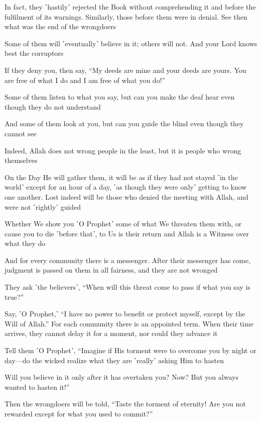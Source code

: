In fact, they ˹hastily˺ rejected the Book without comprehending it and before the fulfilment of its warnings. Similarly, those before them were in denial. See then what was the end of the wrongdoers

Some of them will ˹eventually˺ believe in it; others will not. And your Lord knows best the corruptors

If they deny you, then say, “My deeds are mine and your deeds are yours. You are free of what I do and I am free of what you do!”

Some of them listen to what you say, but can you make the deaf hear even though they do not understand

And some of them look at you, but can you guide the blind even though they cannot see

Indeed, Allah does not wrong people in the least, but it is people who wrong themselves

On the Day He will gather them, it will be as if they had not stayed ˹in the world˺ except for an hour of a day, ˹as though they were only˺ getting to know one another. Lost indeed will be those who denied the meeting with Allah, and were not ˹rightly˺ guided

Whether We show you ˹O Prophet˺ some of what We threaten them with, or cause you to die ˹before that˺, to Us is their return and Allah is a Witness over what they do

And for every community there is a messenger. After their messenger has come, judgment is passed on them in all fairness, and they are not wronged

They ask ˹the believers˺, “When will this threat come to pass if what you say is true?”

Say, ˹O Prophet,˺ “I have no power to benefit or protect myself, except by the Will of Allah.” For each community there is an appointed term. When their time arrives, they cannot delay it for a moment, nor could they advance it

Tell them ˹O Prophet˺, “Imagine if His torment were to overcome you by night or day—do the wicked realize what they are ˹really˺ asking Him to hasten

Will you believe in it only after it has overtaken you? Now? But you always wanted to hasten it!”

Then the wrongdoers will be told, “Taste the torment of eternity! Are you not rewarded except for what you used to commit?”

